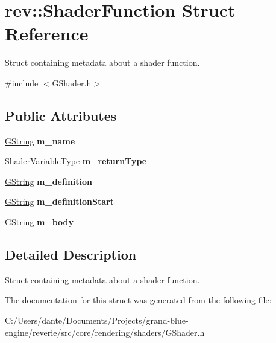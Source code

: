 \hypertarget{structrev_1_1_shader_function}{}\section{rev\+::Shader\+Function Struct Reference}
\label{structrev_1_1_shader_function}


Struct containing metadata about a shader function.  




{\ttfamily \#include $<$G\+Shader.\+h$>$}

\subsection*{Public Attributes}
\begin{DoxyCompactItemize}
\item 
\mbox{\label{structrev_1_1_shader_function_a66a6c077d79ecda1db912e994aca5eed}} 
\mbox{\hyperlink{classrev_1_1_g_string}{G\+String}} {\bfseries m\+\_\+name}
\item 
\mbox{\label{structrev_1_1_shader_function_a169b64f3cfaa1afef1ab45b9d22125d3}} 
Shader\+Variable\+Type {\bfseries m\+\_\+return\+Type}
\item 
\mbox{\label{structrev_1_1_shader_function_a5ddf576659482ec6e56e26a1f464469d}} 
\mbox{\hyperlink{classrev_1_1_g_string}{G\+String}} {\bfseries m\+\_\+definition}
\item 
\mbox{\label{structrev_1_1_shader_function_abc369a66a9d8569803e7d45e74b83644}} 
\mbox{\hyperlink{classrev_1_1_g_string}{G\+String}} {\bfseries m\+\_\+definition\+Start}
\item 
\mbox{\label{structrev_1_1_shader_function_a12820aa5eee7d6fe1820880e368e71e5}} 
\mbox{\hyperlink{classrev_1_1_g_string}{G\+String}} {\bfseries m\+\_\+body}
\end{DoxyCompactItemize}


\subsection{Detailed Description}
Struct containing metadata about a shader function. 

The documentation for this struct was generated from the following file\+:\begin{DoxyCompactItemize}
\item 
C\+:/\+Users/dante/\+Documents/\+Projects/grand-\/blue-\/engine/reverie/src/core/rendering/shaders/G\+Shader.\+h\end{DoxyCompactItemize}
